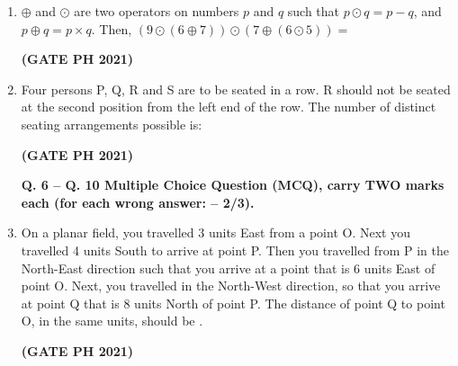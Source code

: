 \documentclass[14pt, a4paper]{extarticle}
\begin{document}
\begin{enumerate}[label=\textbf{Q.\arabic*}]
\item $\oplus$ and $\odot$ are two operators on numbers $p$ and $q$ such that $p \odot q = p-q$, and $p \oplus q = p \times q$. Then, $(9 \odot (6 \oplus 7)) \odot (7 \oplus (6 \odot 5)) = $
\begin{enumerate}
\end{enumerate}
\hfill \textbf{(GATE PH 2021)}

\item Four persons P, Q, R and S are to be seated in a row. R should not be seated at the second position from the left end of the row. The number of distinct seating arrangements possible is:
\begin{enumerate}
\end{enumerate}
\hfill \textbf{(GATE PH 2021)}

\textbf{Q. 6 – Q. 10 Multiple Choice Question (MCQ), carry TWO marks each (for each wrong answer: – 2/3).}

\item On a planar field, you travelled 3 units East from a point O. Next you travelled 4 units South to arrive at point P. Then you travelled from P in the North-East direction such that you arrive at a point that is 6 units East of point O. Next, you travelled in the North-West direction, so that you arrive at point Q that is 8 units North of point P.
The distance of point Q to point O, in the same units, should be \underline{\hspace{3cm}}.
\begin{enumerate}
\end{enumerate}
\hfill \textbf{(GATE PH 2021)}


\end{enumerate}
\end{document}
